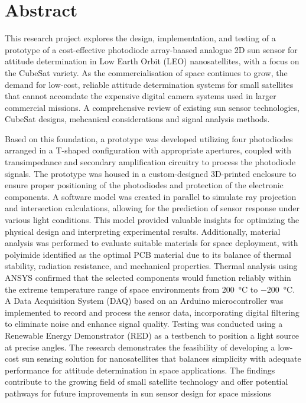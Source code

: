 \chapter*{Abstract}
This research project explores the design, implementation, and testing of a prototype of a cost-effective photodiode array-baased analogue 2D sun sensor for attitude determination in Low Earth Orbit (LEO) nanosatellites, with a focus on the CubeSat variety. 
As the commercialisation of space continues to grow, the demand for low-cost, reliable attitude determination systems for small satellites that cannot accomdate the expensive digital camera systems used in larger commercial missions.
A comprehensive review of existing sun sensor technologies, CubeSat designs, mehcanical considerations and signal analysis methods.

Based on this foundation, a prototype was developed utilizing four photodiodes arranged in a T-shaped configuration with appropriate apertures, coupled with transimpedance and secondary amplification circuitry to process the photodiode signals. 
The prototype was housed in a custom-designed 3D-printed enclosure to ensure proper positioning of the photodiodes and protection of the electronic components.
A software model was created in parallel to simulate ray projection and intersection calculations, allowing for the prediction of sensor response under various light conditions. 
This model provided valuable insights for optimizing the physical design and interpreting experimental results. 
Additionally, material analysis was performed to evaluate suitable materials for space deployment, with polyimide identified as the optimal PCB material due to its balance of thermal stability, radiation resistance, and mechanical properties. 
Thermal analysis using ANSYS confirmed that the selected components would function reliably within the extreme temperature range of space environments from \SI{200}{\celsius} to \SI{-200}{\celsius}.
A Data Acquisition System (DAQ) based on an Arduino microcontroller was implemented to record and process the sensor data, incorporating digital filtering to eliminate noise and enhance signal quality. 
Testing was conducted using a Renewable Energy Demonstrator (RED) as a testbench to position a light source at precise angles.
The research demonstrates the feasibility of developing a low-cost sun sensing solution for nanosatellites that balances simplicity with adequate performance for attitude determination in space applications. 
The findings contribute to the growing field of small satellite technology and offer potential pathways for future improvements in sun sensor design for space missions
